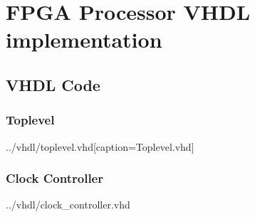 \chapter{FPGA Processor VHDL implementation}
\section{VHDL Code}

\clearpage
\subsection{Toplevel}

{../vhdl/toplevel.vhd}[caption={Toplevel.vhd}]

\clearpage
\subsection{Clock Controller}

{../vhdl/clock_controller.vhd}

% 

% 

% 

% 

% 

